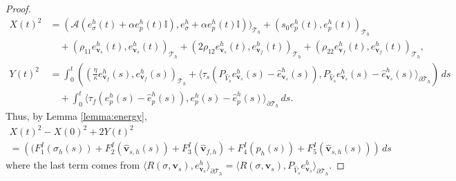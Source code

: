 \documentclass[10pt,letterpaper]{amsart}
\theoremstyle{plain} %
\theoremstyle{remark} %
\newcommand{\vect}[1]{\mathbf{#1}}
\newcommand{\Id}{\mathbb{I}} %
\newcommand{\Ael}{\mathcal{A}} %
\newcommand{\Thprod}[2]{( #1, #2 )_{\mathcal{T}_h}}
\newcommand{\pThprod}[2]{\langle #1, #2 \rangle_{\partial \mathcal{T}_{h}}}
\begin{document}
\begin{proof}
	\begin{align*}
		X(t)^2 &= \Thprod{\Ael(e_{\sigma}^{h}(t) + \alpha e_{p}^{h}(t) \Id)}{e_{\sigma}^{h} + \alpha e_{p}^{h}(t) \Id)} +\Thprod{s_{0}e_{p}^{h}(t)}{e_{p}^h(t)}
		\\
		&\quad + \Thprod{\rho_{11} e_{\vect{v}_{s}}^{h}(t)}{e_{\vect{v}_{s}}^{h}(t)} +\Thprod{2\rho_{12} e_{\vect{v}_{s}}^{h}(t)}{e_{\vect{v}_{f}}^{h}(t)} + \Thprod{\rho_{22} e_{\vect{v}_{f}}^{h}(t)}{e_{\vect{v}_{f}}^{h}(t)} ,
		\\
		Y(t)^2 &= \int_0^t \left( \Thprod{\frac{\eta}{\kappa} e_{\vect{v}_{f}}^{h}(s)}{e_{\vect{v}_{f}}^{h}(s)} + \pThprod{\tau_{s} (P_{\widehat{V}_s} e_{\vect{v}_{s}}^{h}(s) - \widehat{e}_{\vect{v}_{s}}^{h}(s))}{P_{\widehat{V}_s} e_{\vect{v}_{s}}^{h}(s) - \widehat{e}_{\vect{v}_{s}}^{h}(s)} \right) \,ds
		\\
		&\quad + \int_0^t \pThprod{\tau_{f} (e_{p}^{h}(s) - \widehat{e}_{p}^{h}(s))}{e_{p}^{h}(s) - \widehat{e}_{p}^{h}(s)} \,ds .
	\end{align*}
	Thus, by Lemma \ref{lemma:energy}, 
	\begin{multline}
		\label{eq:semidiscrete-energy-error}
		X(t)^2 - X(0)^2 + 2Y(t)^2 
        \\
        = \left( (F_1^I(\sigma_h(s)) + F_2^I(\widehat{\vect{v}}_{s,h}(s)) + F_3^I(\widehat{\vect{v}}_{f,h}) + F_4^I(p_h(s)) + F_5^I(\widehat{\vect{v}}_{s,h}(s))\right) \, ds
	\end{multline}
	where the last term comes from $\pThprod{R(\sigma, \vect{v}_{s})}{e_{\vect{v}_{s}}^{h}} = \pThprod{R(\sigma, \vect{v}_{s})}{P_{\widehat{V}_s} e_{\vect{v}_{s}}^{h}}$. 
	

\end{proof}
\end{document}
